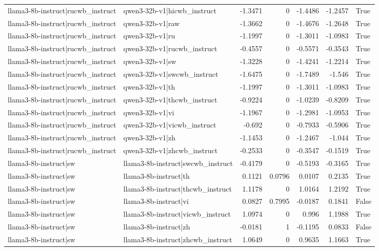 \begin{table}
\begin{tabular}{l l r r r r l}
llama3-8b-instruct|rucwb_instruct & qwen3-32b-v1|hicwb_instruct & -1.3471 & 0 & -1.4486 & -1.2457 & True \\
llama3-8b-instruct|rucwb_instruct & qwen3-32b-v1|raw & -1.3662 & 0 & -1.4676 & -1.2648 & True \\
llama3-8b-instruct|rucwb_instruct & qwen3-32b-v1|ru & -1.1997 & 0 & -1.3011 & -1.0983 & True \\
llama3-8b-instruct|rucwb_instruct & qwen3-32b-v1|rucwb_instruct & -0.4557 & 0 & -0.5571 & -0.3543 & True \\
llama3-8b-instruct|rucwb_instruct & qwen3-32b-v1|sw & -1.3228 & 0 & -1.4241 & -1.2214 & True \\
llama3-8b-instruct|rucwb_instruct & qwen3-32b-v1|swcwb_instruct & -1.6475 & 0 & -1.7489 & -1.546 & True \\
llama3-8b-instruct|rucwb_instruct & qwen3-32b-v1|th & -1.1997 & 0 & -1.3011 & -1.0983 & True \\
llama3-8b-instruct|rucwb_instruct & qwen3-32b-v1|thcwb_instruct & -0.9224 & 0 & -1.0239 & -0.8209 & True \\
llama3-8b-instruct|rucwb_instruct & qwen3-32b-v1|vi & -1.1967 & 0 & -1.2981 & -1.0953 & True \\
llama3-8b-instruct|rucwb_instruct & qwen3-32b-v1|vicwb_instruct & -0.692 & 0 & -0.7933 & -0.5906 & True \\
llama3-8b-instruct|rucwb_instruct & qwen3-32b-v1|zh & -1.1453 & 0 & -1.2467 & -1.044 & True \\
llama3-8b-instruct|rucwb_instruct & qwen3-32b-v1|zhcwb_instruct & -0.2533 & 0 & -0.3547 & -0.1519 & True \\
llama3-8b-instruct|sw & llama3-8b-instruct|swcwb_instruct & -0.4179 & 0 & -0.5193 & -0.3165 & True \\
llama3-8b-instruct|sw & llama3-8b-instruct|th & 0.1121 & 0.0796 & 0.0107 & 0.2135 & True \\
llama3-8b-instruct|sw & llama3-8b-instruct|thcwb_instruct & 1.1178 & 0 & 1.0164 & 1.2192 & True \\
llama3-8b-instruct|sw & llama3-8b-instruct|vi & 0.0827 & 0.7995 & -0.0187 & 0.1841 & False \\
llama3-8b-instruct|sw & llama3-8b-instruct|vicwb_instruct & 1.0974 & 0 & 0.996 & 1.1988 & True \\
llama3-8b-instruct|sw & llama3-8b-instruct|zh & -0.0181 & 1 & -0.1195 & 0.0833 & False \\
llama3-8b-instruct|sw & llama3-8b-instruct|zhcwb_instruct & 1.0649 & 0 & 0.9635 & 1.1663 & True \\

\end{tabular}
\end{table}
